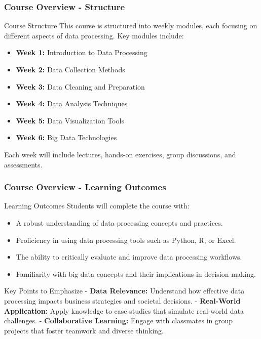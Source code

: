 \documentclass[aspectratio=169]{beamer}
\begin{document}
\begin{frame}[fragile]
    \frametitle{Course Overview - Structure}
    \begin{block}{Course Structure}
        This course is structured into weekly modules, each focusing on different aspects of data processing. Key modules include:
    \end{block}

    \begin{itemize}
        \item \textbf{Week 1:} Introduction to Data Processing
        \item \textbf{Week 2:} Data Collection Methods
        \item \textbf{Week 3:} Data Cleaning and Preparation
        \item \textbf{Week 4:} Data Analysis Techniques
        \item \textbf{Week 5:} Data Visualization Tools
        \item \textbf{Week 6:} Big Data Technologies
    \end{itemize}

    Each week will include lectures, hands-on exercises, group discussions, and assessments.
\end{frame}

\begin{frame}[fragile]
    \frametitle{Course Overview - Learning Outcomes}
    \begin{block}{Learning Outcomes}
        Students will complete the course with:
    \end{block}

    \begin{itemize}
        \item A robust understanding of data processing concepts and practices.
        \item Proficiency in using data processing tools such as Python, R, or Excel.
        \item The ability to critically evaluate and improve data processing workflows.
        \item Familiarity with big data concepts and their implications in decision-making.
    \end{itemize}

    \begin{block}{Key Points to Emphasize}
        - \textbf{Data Relevance:} Understand how effective data processing impacts business strategies and societal decisions.
        - \textbf{Real-World Application:} Apply knowledge to case studies that simulate real-world data challenges.
        - \textbf{Collaborative Learning:} Engage with classmates in group projects that foster teamwork and diverse thinking.
    \end{block}
\end{frame}
\end{document}
